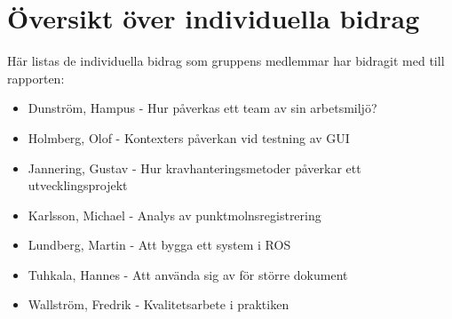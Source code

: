 \section{Översikt över individuella bidrag}

Här listas de individuella bidrag som gruppens medlemmar har bidragit med till rapporten:

\begin{itemize}
	\item Dunström, Hampus - Hur påverkas ett team av sin arbetsmiljö?
	\item Holmberg, Olof - Kontexters påverkan vid testning av GUI
	\item Jannering, Gustav - Hur kravhanteringsmetoder påverkar ett utvecklingsprojekt
	\item Karlsson, Michael - Analys av punktmolnsregistrering
	\item Lundberg, Martin - Att bygga ett system i ROS
	\item Tuhkala, Hannes - Att använda sig av \latex för större dokument
	\item Wallström, Fredrik - Kvalitetsarbete i praktiken
\end{itemize}


